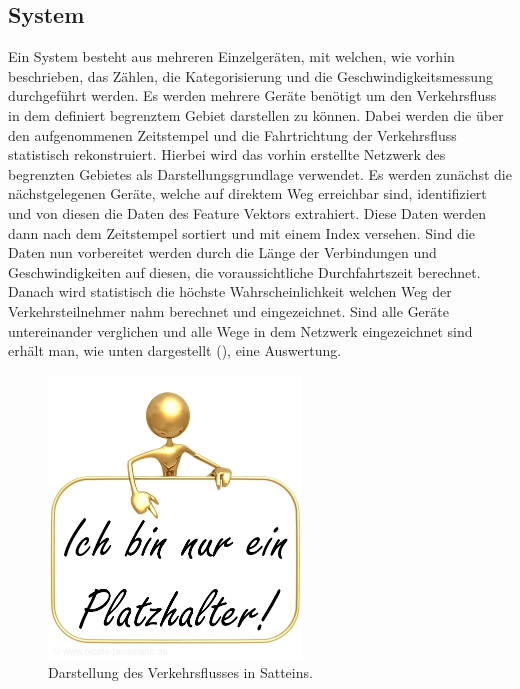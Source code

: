 \subsection{System}
Ein System besteht aus mehreren Einzelgeräten, mit welchen, wie vorhin beschrieben, das Zählen, die Kategorisierung und die Geschwindigkeitsmessung durchgeführt werden. Es werden mehrere Geräte benötigt um den Verkehrsfluss in dem definiert begrenztem Gebiet darstellen zu können. Dabei werden die über den aufgenommenen Zeitstempel und die Fahrtrichtung der Verkehrsfluss statistisch rekonstruiert. Hierbei wird das vorhin erstellte Netzwerk des begrenzten Gebietes als Darstellungsgrundlage verwendet. Es werden zunächst die nächstgelegenen Geräte, welche auf direktem Weg erreichbar sind, identifiziert und von diesen die Daten des Feature Vektors extrahiert. Diese Daten werden dann nach dem Zeitstempel sortiert und mit einem Index versehen. Sind die Daten nun vorbereitet werden durch die Länge der Verbindungen und Geschwindigkeiten auf diesen, die voraussichtliche Durchfahrtszeit berechnet. Danach wird statistisch die höchste Wahrscheinlichkeit welchen Weg der Verkehrsteilnehmer nahm berechnet und eingezeichnet. Sind alle Geräte untereinander verglichen und alle Wege in dem Netzwerk eingezeichnet sind erhält man, wie unten dargestellt (), eine Auswertung. 

\begin{figure}[H]
  \centering
  \includegraphics[width=0.6\textwidth]{Resultate/Auswertung.jpg} 
  \caption{Darstellung des Verkehrsflusses in Satteins.}
  \label{bAuswertung}
\end{figure}